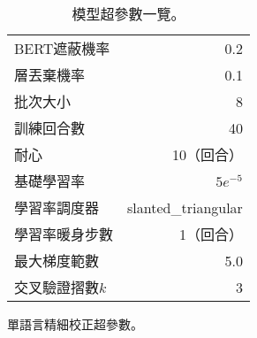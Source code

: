 \begin{table}[htbp]
\begin{subtable}[t]{.4\textwidth}
\begin{tabular}[t]{@{}lr@{}}
            BERT遮蔽機率        & 0.2 \\
            層丟棄機率          & 0.1 \\
            批次大小            & 8 \\
            訓練回合數          & 40 \\
            耐心               & 10（回合）\\
            基礎學習率          & $5e^{-5}$ \\
            學習率調度器        & slanted\_triangular \\
            學習率暖身步數       & 1（回合）\\
            最大梯度範數        & 5.0 \\
            交叉驗證摺數$k$     & 3   \\
        \bottomrule
        \end{tabular}
        \caption{
            單語言精細校正超參數。
        }
        \label{tab:monoft_hparams}
    \end{subtable}
    \caption{
        模型超參數一覽。
    }
    \label{tab:hparams}
\end{table}